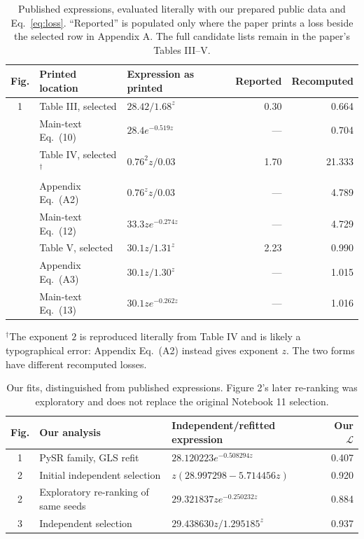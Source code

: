 \documentclass[11pt]{article}
\begin{document}
\begin{table}[htbp]
\centering\small
\caption{Published expressions, evaluated literally with our prepared public data and Eq.~\eqref{eq:loss}. ``Reported'' is populated only where the paper prints a loss beside the selected row in Appendix A. The full candidate lists remain in the paper's Tables III--V.}
\label{tab:printed}
\begin{tabular}{@{}clp{5.0cm}rr@{}}
\toprule
Fig. & Printed location & Expression as printed & Reported & Recomputed\\
\midrule
1 & Table III, selected & $28.42/1.68^z$ & 0.30 & 0.664\\
  & Main-text Eq.~(10) & $28.4e^{-0.519z}$ & --- & 0.704\\
\addlinespace
2 & Table IV, selected$^{\dagger}$ & $0.76^{2}z/0.03$ & 1.70 & 21.333\\
  & Appendix Eq.~(A2) & $0.76^{z}z/0.03$ & --- & 4.789\\
  & Main-text Eq.~(12) & $33.3ze^{-0.274z}$ & --- & 4.729\\
\addlinespace
3 & Table V, selected & $30.1z/1.31^z$ & 2.23 & 0.990\\
  & Appendix Eq.~(A3) & $30.1z/1.30^z$ & --- & 1.015\\
  & Main-text Eq.~(13) & $30.1ze^{-0.262z}$ & --- & 1.016\\
\bottomrule
\end{tabular}
\par\smallskip\footnotesize $^{\dagger}$The exponent $2$ is reproduced literally from Table IV and is likely a typographical error: Appendix Eq.~(A2) instead gives exponent $z$. The two forms have different recomputed losses.
\end{table}

\begin{table}[htbp]
\centering\small
\caption{Our fits, distinguished from published expressions. Figure 2's later re-ranking was exploratory and does not replace the original Notebook 11 selection.}
\label{tab:ourfits}
\begin{tabular}{@{}clp{6.5cm}r@{}}
\toprule
Fig. & Our analysis & Independent/refitted expression & Our $\mathcal L$\\
\midrule
1 & PySR family, GLS refit & $28.120223e^{-0.508294z}$ & 0.407\\
2 & Initial independent selection & $z(28.997298-5.714456z)$ & 0.920\\
2 & Exploratory re-ranking of same seeds & $29.321837ze^{-0.250232z}$ & 0.884\\
3 & Independent selection & $29.438630z/1.295185^z$ & 0.937\\
\bottomrule
\end{tabular}
\end{table}
\clearpage
\end{document}
